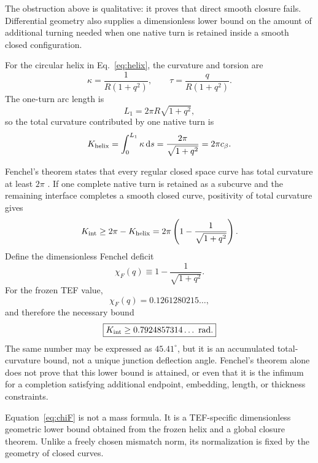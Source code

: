 \documentclass[10pt]{article}
\newcommand{\dd}{\mathrm{d}}
\begin{document}
The obstruction above is qualitative: it proves that direct smooth closure fails. Differential geometry also supplies a dimensionless lower bound on the amount of additional turning needed when one native turn is retained inside a smooth closed configuration.

For the circular helix in Eq.~\eqref{eq:helix}, the curvature and torsion are
\begin{equation}
\kappa=\frac{1}{R(1+q^2)},
\qquad
\tau=\frac{q}{R(1+q^2)}.
\label{eq:kappatau}
\end{equation}
The one-turn arc length is
\begin{equation}
L_1=2\pi R\sqrt{1+q^2},
\end{equation}
so the total curvature contributed by one native turn is
\begin{equation}
K_{\rm helix}
=\int_{0}^{L_1}\kappa\,\dd s
=\frac{2\pi}{\sqrt{1+q^2}}
=2\pi c_\beta.
\label{eq:Khelix}
\end{equation}

Fenchel's theorem states that every regular closed space curve has total curvature at least $2\pi$ \cite{Fenchel1929}. If one complete native turn is retained as a subcurve and the remaining interface completes a smooth closed curve, positivity of total curvature gives
\begin{equation}
K_{\rm int}
\geq
2\pi-K_{\rm helix}
=2\pi\left(1-\frac{1}{\sqrt{1+q^2}}\right).
\label{eq:Kint}
\end{equation}
Define the dimensionless Fenchel deficit
\begin{equation}
\boxed{
\chi_F(q)
\equiv
1-\frac{1}{\sqrt{1+q^2}}.
}
\label{eq:chiF}
\end{equation}
For the frozen TEF value,
\begin{equation}
\boxed{
\chi_F(q)
=0.1261280215\ldots,
}
\label{eq:chiFNumeric}
\end{equation}
and therefore the necessary bound
\begin{equation}
\boxed{K_{\rm int}\ge 0.7924857314\ldots\ \mathrm{rad}.}
\label{eq:KintNumeric}
\end{equation}
The same number may be expressed as $45.41^{\circ}$, but it is an accumulated total-curvature bound, not a unique junction deflection angle. Fenchel's theorem alone does not prove that this lower bound is attained, or even that it is the infimum for a completion satisfying additional endpoint, embedding, length, or thickness constraints.

Equation~\eqref{eq:chiF} is not a mass formula. It is a TEF-specific dimensionless geometric lower bound obtained from the frozen helix and a global closure theorem. Unlike a freely chosen mismatch norm, its normalization is fixed by the geometry of closed curves.
\end{document}
